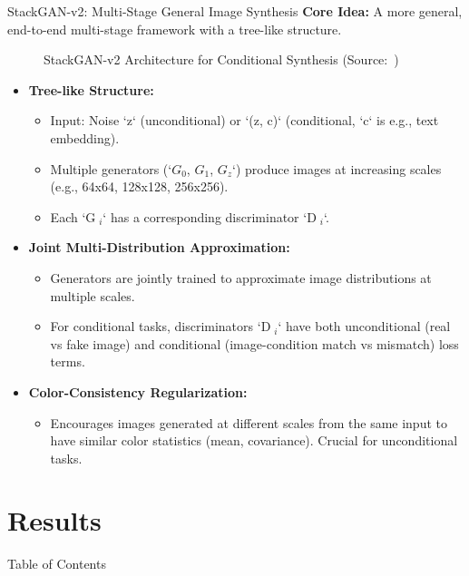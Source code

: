\documentclass{beamer}
\newcommand{\paperfigure}[3][width=\textwidth]{%
    \begin{figure}%
        \centering%
        \caption{#3 (Source:~\cite{stackgan++})}%
        \label{fig:#2}%
    \end{figure}%
}
\begin{document}
\begin{frame}{StackGAN-v2: Multi-Stage General Image Synthesis}
    \textbf{Core Idea:} A more general, end-to-end multi-stage framework with a tree-like structure.
    \paperfigure[width=0.9\textwidth]{fig2_stackgan_v2}{StackGAN-v2 Architecture for Conditional Synthesis}
    \begin{itemize}
        \item \textbf{Tree-like Structure:}
            \begin{itemize}
                \item Input: Noise `z` (unconditional) or `(z, c)` (conditional, `c` is e.g., text embedding).
                \item Multiple generators (`$G_0$, $G_1$, $G_z$`) produce images at increasing scales (e.g., 64x64, 128x128, 256x256).
                \item Each `G$\phantom{.}_i$` has a corresponding discriminator `D$\phantom{.}_i$`.
            \end{itemize}
        \item \textbf{Joint Multi-Distribution Approximation:}
            \begin{itemize}
                \item Generators are jointly trained to approximate image distributions at multiple scales.
                \item For conditional tasks, discriminators `D$\phantom{.}_i$` have both unconditional (real vs fake image) and conditional (image-condition match vs mismatch) loss terms.
            \end{itemize}
        \item \textbf{Color-Consistency Regularization:}
            \begin{itemize}
                \item Encourages images generated at different scales from the same input to have similar color statistics (mean, covariance). Crucial for unconditional tasks.
            \end{itemize}
    \end{itemize}
\end{frame}


\section{Results}
\begin{frame}{Table of Contents}
    \tableofcontents[currentsection]
\end{frame}
\end{document}
